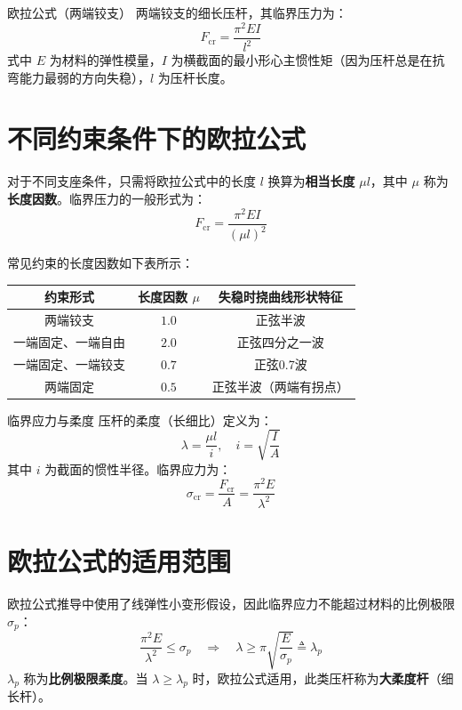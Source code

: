 \begin{myTheorem}{欧拉公式（两端铰支）}
    两端铰支的细长压杆，其临界压力为：
    \[
    \boxed{F_{\text{cr}} = \frac{\pi^2 EI}{l^2}}
    \]
    式中 \(E\) 为材料的弹性模量，\(I\) 为横截面的最小形心主惯性矩（因为压杆总是在抗弯能力最弱的方向失稳），\(l\) 为压杆长度。
\end{myTheorem}

\section{不同约束条件下的欧拉公式}

对于不同支座条件，只需将欧拉公式中的长度 \(l\) 换算为\textbf{相当长度} \(\mu l\)，其中 \(\mu\) 称为\textbf{长度因数}。临界压力的一般形式为：
\[
F_{\text{cr}} = \frac{\pi^2 EI}{(\mu l)^2}
\]

常见约束的长度因数如下表所示：

\begin{center}
\begin{tabular}{|c|c|c|}
\hline
\textbf{约束形式} & \textbf{长度因数 \(\mu\)} & \textbf{失稳时挠曲线形状特征} \\ \hline
两端铰支 & \(1.0\) & 正弦半波 \\ \hline
一端固定、一端自由 & \(2.0\) & 正弦四分之一波 \\ \hline
一端固定、一端铰支 & \(0.7\) & 正弦0.7波 \\ \hline
两端固定 & \(0.5\) & 正弦半波（两端有拐点） \\ \hline
\end{tabular}
\end{center}

\begin{myTheorem}{临界应力与柔度}
    压杆的柔度（长细比）定义为：
    \[
    \lambda = \frac{\mu l}{i}, \quad i = \sqrt{\frac{I}{A}}
    \]
    其中 \(i\) 为截面的惯性半径。临界应力为：
    \[
    \sigma_{\text{cr}} = \frac{F_{\text{cr}}}{A} = \frac{\pi^2 E}{\lambda^2}
    \]
\end{myTheorem}

\section{欧拉公式的适用范围}

欧拉公式推导中使用了线弹性小变形假设，因此临界应力不能超过材料的比例极限 \(\sigma_p\)：
\[
\frac{\pi^2 E}{\lambda^2} \le \sigma_p \quad \Rightarrow \quad \lambda \ge \pi \sqrt{\frac{E}{\sigma_p}} \triangleq \lambda_p
\]
\(\lambda_p\) 称为\textbf{比例极限柔度}。当 \(\lambda \ge \lambda_p\) 时，欧拉公式适用，此类压杆称为\textbf{大柔度杆}（细长杆）。

